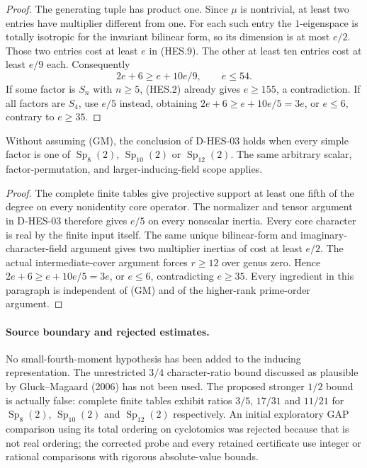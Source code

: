 \begin{proof}
The generating tuple has product one. Since $\mu$ is nontrivial, at least
two entries have multiplier different from one. For each such entry the
$1$-eigenspace is totally isotropic for the invariant bilinear form, so its
dimension is at most $e/2$. Those two entries cost at least $e$ in (HES.9).
The other at least ten entries cost at least $e/9$ each. Consequently
\[
                  2e+6\ge e+10e/9,
                  \qquad e\le54.
\tag{HES.10}
\]
If some factor is $S_n$ with $n\ge5$, (HES.2) already gives $e\ge155$,
a contradiction. If all factors are $S_4$, use $e/5$ instead, obtaining
$2e+6\ge e+10e/5=3e$, or $e\le6$, contrary to $e\ge35$.
\end{proof}

\begin{corollary}
Without assuming (GM), the conclusion of D-HES-03 holds when every simple
factor is one of $\operatorname{Sp}_8(2)$, $\operatorname{Sp}_{10}(2)$ or
$\operatorname{Sp}_{12}(2)$. The same arbitrary scalar, factor-permutation,
and larger-inducing-field scope applies.
\end{corollary}
\begin{proof}
The complete finite tables give projective support at least one fifth of
the degree on every nonidentity core operator. The normalizer and tensor
argument in D-HES-03 therefore gives $e/5$ on every nonscalar inertia.
Every core character is real by the finite input itself. The same unique
bilinear-form and imaginary-character-field argument gives two multiplier
inertias of cost at least $e/2$. The actual intermediate-cover argument
forces $r\ge12$ over genus zero. Hence $2e+6\ge e+10e/5=3e$, or $e\le6$,
contradicting $e\ge35$. Every ingredient in this paragraph is independent
of (GM) and of the higher-rank prime-order argument.
\end{proof}

\paragraph{Source boundary and rejected estimates.}
No small-fourth-moment hypothesis has been added to the inducing
representation. The unrestricted $3/4$ character-ratio bound discussed as
plausible by Gluck--Magaard (2006) has not been used. The proposed stronger
$1/2$ bound is actually false: complete finite tables exhibit ratios $3/5$,
$17/31$ and $11/21$ for $\operatorname{Sp}_8(2)$,
$\operatorname{Sp}_{10}(2)$ and $\operatorname{Sp}_{12}(2)$ respectively.
An initial exploratory GAP comparison using its total ordering on
cyclotomics was rejected because that is not real ordering; the corrected
probe and every retained certificate use integer or rational comparisons
with rigorous absolute-value bounds.
